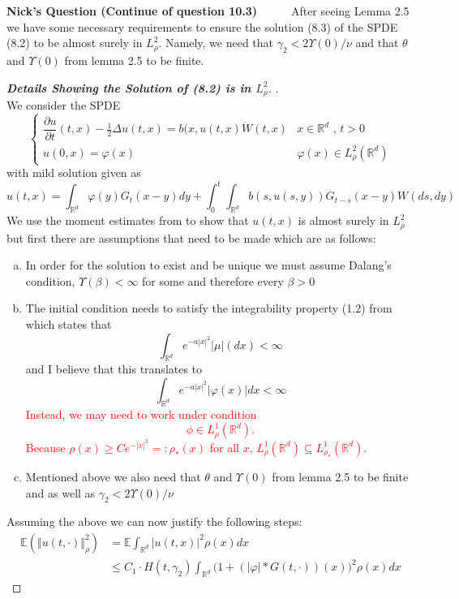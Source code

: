 \documentclass[a4paper,11pt]{article}
\theoremstyle{plain}
\theoremstyle{definition}
\newcommand{\E}{\mathbb{E}}
\newcommand{\R}{\mathbb{R}}
\newcounter{NQ}
\newenvironment{NickQuestion}[1][] %
  {\refstepcounter{NQ}
  \begin{mdframed}[backgroundcolor=lightgray]\textbf{Nick's Question \theNQ \: #1~~}~~~\noindent}%
  {\end{mdframed}}
\numberwithin{NQ}{section}
\numberwithin{LQ}{section}
\numberwithin{ZQ}{section}
\begin{document}
\begin{NickQuestion}[(Continue of question 10.3)]
After seeing Lemma 2.5 we have some necessary requirements to ensure the solution (8.3) of the SPDE (8.2) to be almost surely in $L^2_\rho$. Namely, we need that $\gamma_2 < 2\Upsilon(0)/\nu$ and that $\theta$ and $\Upsilon(0)$ from lemma 2.5 to be finite. 
\end{NickQuestion}

\newpage

\begin{proof}[\textbf{Details Showing the Solution of (8.2) is in $L^2_\rho$}].  
\\
We consider the SPDE 
$$\begin{cases}
   \dfrac{\partial u}{\partial t}(t,x)-\frac{1}{2}\Delta u(t,x) = b(x,u(t,x)\dot W(t,x) & \text{$x\in \mathbb R^d$ , $t>0$}
   \\ u(0,x)=\varphi(x) & \varphi(x) \in L^2_\rho(\mathbb R^d)
\end{cases}$$ 
with mild solution given as 
$$     u(t,x)=\int_{\mathbb R^d}\varphi (y)G_t(x-y)dy + \int_0^t\int_{\mathbb R^d}b(s,u(s,y))G_{t-s}(x-y)W(ds,dy) $$
We use the moment estimates from \cite{CH16Comparison} to show that $u(t,x)$ is almost surely in $L^2_\rho$ but first there are assumptions that need to be made which are as follows: 
\begin{enumerate}[(a)]
    \item In order for the solution to exist and be unique we must assume Dalang's condition, \mbox{$\Upsilon(\beta)<\infty$} for some and therefore every $\beta>0$
    \item The initial condition needs to satisfy the integrability property (1.2) from \cite{CH16Comparison} which states that $$ \int_{\mathbb R^d}e^{-a|x|^2}|\mu|(dx) < \infty $$
    and I believe that this translates to $$ \int_{\mathbb R^d}e^{-a|x|^2}|\varphi(x)|dx < \infty $$
    \textcolor{red}{Instead, we may need to work under condition 
    \[
    \phi\in L_\rho^1(\R^d).
    \]
    Because $\rho(x)\ge C e^{-|x|^2}=:\rho_*(x)$ for all $x$, $L_\rho^1(\R^d)\subseteq L_{\rho_*}^1(\R^d)$.}
    \item Mentioned above we also need that $\theta$ and $\Upsilon(0)$ from lemma 2.5 to be finite and as well as $\gamma_2 < 2\Upsilon(0)/\nu$ 
\end{enumerate}   
Assuming the above we can now justify the following steps:
\begin{align}
    \E\left(\Vert u(t,\cdot)\Vert_\rho^2\right) &= \E \int_{\mathbb R^d}\vert u(t,x) \vert^2 \rho(x)dx 
    \\&\le C_1\cdot H(t,\gamma_2)\int_{\mathbb R^d}\bigg(1+(|\varphi|*G(t,\cdot))(x)\bigg)^2\rho(x)dx 

\end{align}
\end{proof}
\end{document}
